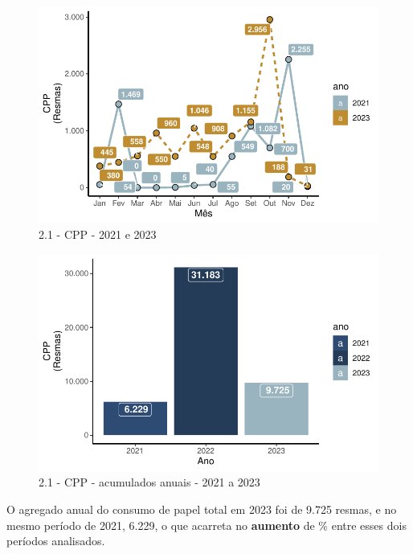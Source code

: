 \documentclass[
  a4paper,
  DIV=11,
  numbers=noendperiod]{scrartcl}
\begin{document}
\begin{figure}[H]

{\centering \includegraphics{relatorio_2023_files/figure-pdf/fig-gcpp-1.pdf}

}

\caption{\label{fig-gcpp}2.1 - CPP - 2021 e 2023}

\end{figure}

\begin{figure}[H]

{\centering \includegraphics{relatorio_2023_files/figure-pdf/fig-gcppac-1.pdf}

}

\caption{\label{fig-gcppac}2.1 - CPP - acumulados anuais - 2021 a 2023}

\end{figure}

O agregado anual do consumo de papel total em 2023 foi de 9.725 resmas,
e no mesmo período de 2021, 6.229, o que acarreta no \textbf{aumento} de
\% entre esses dois períodos analisados.
\end{document}
